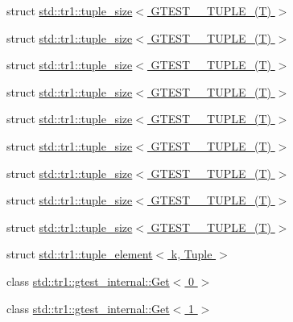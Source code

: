 \begin{DoxyCompactItemize}
\item 
struct \hyperlink{structstd_1_1tr1_1_1tuple__size_3_01_g_t_e_s_t__2___t_u_p_l_e___07_t_08_01_4}{std\+::tr1\+::tuple\+\_\+size$<$ G\+T\+E\+S\+T\+\_\+\_\+\+T\+U\+P\+L\+E\+\_\+(\+T) $>$}
\item 
struct \hyperlink{structstd_1_1tr1_1_1tuple__size_3_01_g_t_e_s_t__3___t_u_p_l_e___07_t_08_01_4}{std\+::tr1\+::tuple\+\_\+size$<$ G\+T\+E\+S\+T\+\_\+\_\+\+T\+U\+P\+L\+E\+\_\+(\+T) $>$}
\item 
struct \hyperlink{structstd_1_1tr1_1_1tuple__size_3_01_g_t_e_s_t__4___t_u_p_l_e___07_t_08_01_4}{std\+::tr1\+::tuple\+\_\+size$<$ G\+T\+E\+S\+T\+\_\+\_\+\+T\+U\+P\+L\+E\+\_\+(\+T) $>$}
\item 
struct \hyperlink{structstd_1_1tr1_1_1tuple__size_3_01_g_t_e_s_t__5___t_u_p_l_e___07_t_08_01_4}{std\+::tr1\+::tuple\+\_\+size$<$ G\+T\+E\+S\+T\+\_\+\_\+\+T\+U\+P\+L\+E\+\_\+(\+T) $>$}
\item 
struct \hyperlink{structstd_1_1tr1_1_1tuple__size_3_01_g_t_e_s_t__6___t_u_p_l_e___07_t_08_01_4}{std\+::tr1\+::tuple\+\_\+size$<$ G\+T\+E\+S\+T\+\_\+\_\+\+T\+U\+P\+L\+E\+\_\+(\+T) $>$}
\item 
struct \hyperlink{structstd_1_1tr1_1_1tuple__size_3_01_g_t_e_s_t__7___t_u_p_l_e___07_t_08_01_4}{std\+::tr1\+::tuple\+\_\+size$<$ G\+T\+E\+S\+T\+\_\+\_\+\+T\+U\+P\+L\+E\+\_\+(\+T) $>$}
\item 
struct \hyperlink{structstd_1_1tr1_1_1tuple__size_3_01_g_t_e_s_t__8___t_u_p_l_e___07_t_08_01_4}{std\+::tr1\+::tuple\+\_\+size$<$ G\+T\+E\+S\+T\+\_\+\_\+\+T\+U\+P\+L\+E\+\_\+(\+T) $>$}
\item 
struct \hyperlink{structstd_1_1tr1_1_1tuple__size_3_01_g_t_e_s_t__9___t_u_p_l_e___07_t_08_01_4}{std\+::tr1\+::tuple\+\_\+size$<$ G\+T\+E\+S\+T\+\_\+\_\+\+T\+U\+P\+L\+E\+\_\+(\+T) $>$}
\item 
struct \hyperlink{structstd_1_1tr1_1_1tuple__size_3_01_g_t_e_s_t__10___t_u_p_l_e___07_t_08_01_4}{std\+::tr1\+::tuple\+\_\+size$<$ G\+T\+E\+S\+T\+\_\+\_\+\+T\+U\+P\+L\+E\+\_\+(\+T) $>$}
\item 
struct \hyperlink{structstd_1_1tr1_1_1tuple__element}{std\+::tr1\+::tuple\+\_\+element$<$ k, Tuple $>$}
\item 
class \hyperlink{classstd_1_1tr1_1_1gtest__internal_1_1_get_3_010_01_4}{std\+::tr1\+::gtest\+\_\+internal\+::\+Get$<$ 0 $>$}
\item 
class \hyperlink{classstd_1_1tr1_1_1gtest__internal_1_1_get_3_011_01_4}{std\+::tr1\+::gtest\+\_\+internal\+::\+Get$<$ 1 $>$}

\end{DoxyCompactItemize}
